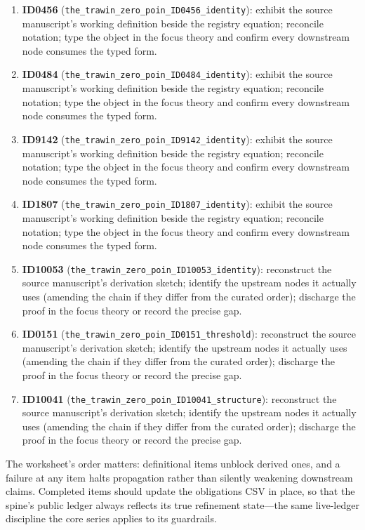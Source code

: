 \documentclass[11pt]{article}
\theoremstyle{remark}
\begin{document}
\begin{enumerate}
\item \textbf{ID0456} (\texttt{the\_trawin\_zero\_poin\_ID0456\_identity}): exhibit the source manuscript's working definition beside the registry equation; reconcile notation; type the object in the focus theory and confirm every downstream node consumes the typed form.
\item \textbf{ID0484} (\texttt{the\_trawin\_zero\_poin\_ID0484\_identity}): exhibit the source manuscript's working definition beside the registry equation; reconcile notation; type the object in the focus theory and confirm every downstream node consumes the typed form.
\item \textbf{ID9142} (\texttt{the\_trawin\_zero\_poin\_ID9142\_identity}): exhibit the source manuscript's working definition beside the registry equation; reconcile notation; type the object in the focus theory and confirm every downstream node consumes the typed form.
\item \textbf{ID1807} (\texttt{the\_trawin\_zero\_poin\_ID1807\_identity}): exhibit the source manuscript's working definition beside the registry equation; reconcile notation; type the object in the focus theory and confirm every downstream node consumes the typed form.
\item \textbf{ID10053} (\texttt{the\_trawin\_zero\_poin\_ID10053\_identity}): reconstruct the source manuscript's derivation sketch; identify the upstream nodes it actually uses (amending the chain if they differ from the curated order); discharge the proof in the focus theory or record the precise gap.
\item \textbf{ID0151} (\texttt{the\_trawin\_zero\_poin\_ID0151\_threshold}): reconstruct the source manuscript's derivation sketch; identify the upstream nodes it actually uses (amending the chain if they differ from the curated order); discharge the proof in the focus theory or record the precise gap.
\item \textbf{ID10041} (\texttt{the\_trawin\_zero\_poin\_ID10041\_structure}): reconstruct the source manuscript's derivation sketch; identify the upstream nodes it actually uses (amending the chain if they differ from the curated order); discharge the proof in the focus theory or record the precise gap.
\end{enumerate}

The worksheet's order matters: definitional items unblock derived ones, and a failure at any item halts propagation rather than silently weakening downstream claims. Completed items should update the obligations CSV in place, so that the spine's public ledger always reflects its true refinement state---the same live-ledger discipline the core series applies to its guardrails.
\end{document}

